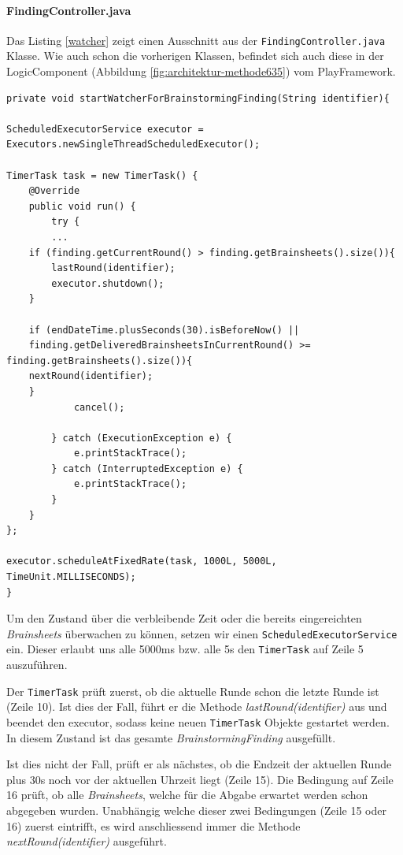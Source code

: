 \paragraph*{FindingController.java}
Das Listing \ref{watcher} zeigt einen Ausschnitt aus der \texttt{FindingController.java} Klasse. Wie auch schon die vorherigen Klassen, befindet sich auch diese in der LogicComponent (Abbildung \ref{fig:architektur-methode635}) vom PlayFramework.
\begin{lstlisting}[caption={Watcher für BrainstormingFinding}, label=watcher]
private void startWatcherForBrainstormingFinding(String identifier){

ScheduledExecutorService executor = Executors.newSingleThreadScheduledExecutor();

TimerTask task = new TimerTask() {
    @Override
    public void run() {
        try {
    	...
	if (finding.getCurrentRound() > finding.getBrainsheets().size()){
	    lastRound(identifier);
	    executor.shutdown();
	}

	if (endDateTime.plusSeconds(30).isBeforeNow() ||
	finding.getDeliveredBrainsheetsInCurrentRound() >= finding.getBrainsheets().size()){
	nextRound(identifier);
	}
            cancel();

        } catch (ExecutionException e) {
            e.printStackTrace();
        } catch (InterruptedException e) {
            e.printStackTrace();
        }
    }
};

executor.scheduleAtFixedRate(task, 1000L, 5000L, TimeUnit.MILLISECONDS);
}
\end{lstlisting}

Um den Zustand über die verbleibende Zeit oder die bereits eingereichten \textit{Brainsheets} überwachen zu können, setzen wir einen \texttt{ScheduledExecutorService} \cite{JavaTimer} ein. Dieser erlaubt uns alle 5000ms bzw. alle 5s den \texttt{TimerTask} auf Zeile 5 auszuführen. 

Der \texttt{TimerTask} prüft zuerst, ob die aktuelle Runde schon die letzte Runde ist (Zeile 10). Ist dies der Fall, führt er die Methode \textit{lastRound(identifier)} aus und beendet den executor, sodass keine neuen \texttt{TimerTask} Objekte gestartet werden. In diesem Zustand ist das gesamte \textit{BrainstormingFinding} ausgefüllt.

Ist dies nicht der Fall, prüft er als nächstes, ob die Endzeit der aktuellen Runde plus 30s noch vor der aktuellen Uhrzeit liegt (Zeile 15). Die Bedingung auf Zeile 16 prüft, ob alle \textit{Brainsheets}, welche für die Abgabe erwartet werden schon abgegeben wurden. Unabhängig welche dieser zwei Bedingungen (Zeile 15 oder 16) zuerst eintrifft, es wird anschliessend immer die Methode \textit{nextRound(identifier)} ausgeführt.

